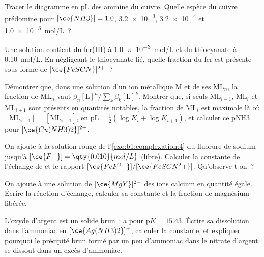 \begin{exercise}[$\star$]\label{exo:b1:complexation:3}
Tracer le diagramme en pL des  ammine du cuivre. Quelle espèce
du cuivre prédomine pour $[\ce{NH3}] = 1.0$, \num{3.2e-3}, \num{3.2e-4}
et \qty{1.0e-5}{mol/L}~?
\end{exercise}

\begin{exercise}[$\star$]\label{exo:b1:complexation:4}
Une solution contient du fer(III) à \qty{1.0e-3}{mol/L} et du
thiocyanate à \qty{0.10}{mol/L}. En négligeant le thiocyanate lié,
quelle fraction du fer est présente sous forme de $[\ce{FeSCN}]^{2+}$~?
\end{exercise}

\begin{exercise}[$\star\star$]\label{exo:b1:complexation:5}
Démontrer que, dans une solution d'un ion métallique M et de ses
$\mathrm{ML}_n$, la fraction de $\mathrm{ML}_n$ vaut
$\beta_n[\mathrm{L}]^n / \sum_{k} \beta_k[\mathrm{L}]^k$. Montrer que,
si seuls $\mathrm{ML}_{i-1}$, $\mathrm{ML}_i$ et $\mathrm{ML}_{i+1}$ sont
présents en quantités notables, la fraction de $\mathrm{ML}_i$ est
maximale là où $[\mathrm{ML}_{i-1}] = [\mathrm{ML}_{i+1}]$, en
$\mathrm{pL} = \frac12(\log K_i + \log K_{i+1})$, et calculer ce pNH3
pour $[\ce{Cu(NH3)2}]^{2+}$.
\end{exercise}

\begin{exercise}[$\star\star$]\label{exo:b1:complexation:6}
On ajoute à la solution rouge de l'\cref{exo:b1:complexation:4} du
fluorure de sodium jusqu'à $[\ce{F-}] = \qty{0.010}{mol/L}$ (libre).
Calculer la constante de l'échange de  et le rapport
$[\ce{FeF^2+}]/[\ce{FeSCN^2+}]$. Qu'observe-t-on~?
\end{exercise}

\begin{exercise}[$\star\star$]\label{exo:b1:complexation:7}
On ajoute à une solution de $[\ce{MgY}]^{2-}$ des ions calcium en
quantité égale. Écrire la réaction d'échange, calculer sa constante et
la fraction de magnésium libérée.
\end{exercise}

\begin{exercise}[$\star\star$]\label{exo:b1:complexation:8}
L'oxyde d'argent  est un solide brun~: 
a pour $\mathrm{p}K = 15.43$. Écrire sa dissolution dans l'ammoniac en
$[\ce{Ag(NH3)2}]^{+}$, calculer la constante, et expliquer pourquoi le
précipité brun formé par un peu d'ammoniac dans le nitrate d'argent se
dissout dans un excès d'ammoniac.
\end{exercise}


